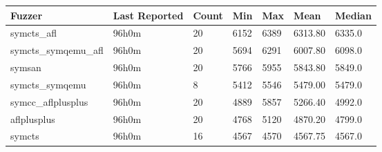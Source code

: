 
\begin{table*}[h]
\centering
\begin{tabular}{|l|l|l|l|l|l|l|}
\hline
\textbf{Fuzzer} & \textbf{Last Reported} & \textbf{Count} & \textbf{Min} & \textbf{Max} & \textbf{Mean} & \textbf{Median} \\
\hline
symcts\_afl        & 96h0m              & 20     & 6152  & 6389  & 6313.80       & 6335.0     \\
symcts\_symqemu\_afl & 96h0m              & 20     & 5694  & 6291  & 6007.80       & 6098.0     \\
symsan             & 96h0m              & 20     & 5766  & 5955  & 5843.80       & 5849.0     \\
symcts\_symqemu    & 96h0m              & 8      & 5412  & 5546  & 5479.00       & 5479.0     \\
symcc\_aflplusplus & 96h0m              & 20     & 4889  & 5857  & 5266.40       & 4992.0     \\
aflplusplus        & 96h0m              & 20     & 4768  & 5120  & 4870.20       & 4799.0     \\
symcts             & 96h0m              & 16     & 4567  & 4570  & 4567.75       & 4567.0     \\
\hline
\end{tabular}
\end{table*}